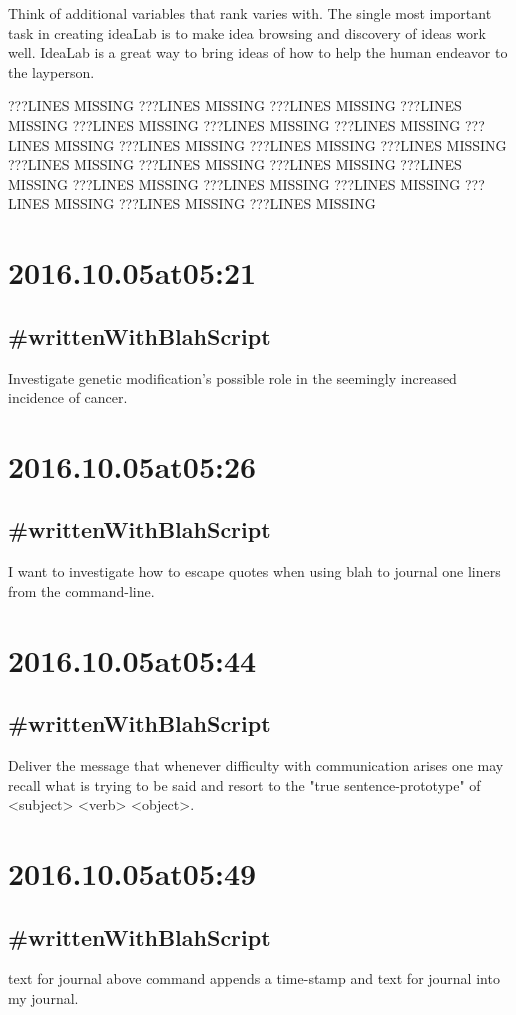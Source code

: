 Think of additional variables that rank varies with. The single most important task in creating ideaLab is to make idea browsing and discovery of ideas work well. IdeaLab is a great way to bring ideas of how to help the human endeavor to the layperson.

???LINES MISSING
???LINES MISSING
???LINES MISSING
???LINES MISSING
???LINES MISSING
???LINES MISSING
???LINES MISSING
???LINES MISSING
???LINES MISSING
???LINES MISSING
???LINES MISSING
???LINES MISSING
???LINES MISSING
???LINES MISSING
???LINES MISSING
???LINES MISSING
???LINES MISSING
???LINES MISSING
???LINES MISSING
???LINES MISSING
???LINES MISSING

\section*{ 2016.10.05at05:21 }
\subsection*{ #writtenWithBlahScript }
Investigate genetic modification's possible role in the seemingly increased incidence of cancer.

\section*{ 2016.10.05at05:26 }
\subsection*{ #writtenWithBlahScript }
I want to investigate how to escape quotes when using blah to journal one liners from the command-line.

\section*{ 2016.10.05at05:44 }
\subsection*{ #writtenWithBlahScript }
Deliver the message that whenever difficulty with communication arises one may recall what is trying to be said and resort to the "true sentence-prototype" of <subject> <verb> <object>.

\section*{ 2016.10.05at05:49 }
\subsection*{ #writtenWithBlahScript }
text for journal
\nThe above command appends a time-stamp and text for journal into my journal.

